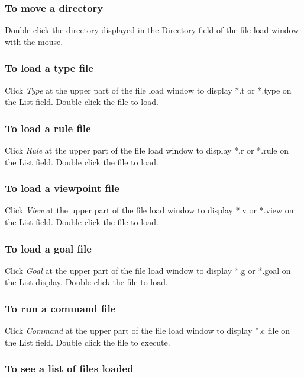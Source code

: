 \subsubsection{To move a directory}
Double click the directory displayed in the Directory field of the file load window with the mouse.

\subsubsection{To load a type file}
Click {\sl Type} at the upper part of the file load window to display *.t or *.type on the List field.
Double click the file to load. 

\subsubsection{To load a rule file}

Click {\sl Rule} at the upper part of the file load window to display *.r or *.rule on the List field.
Double click the file to load. 

\subsubsection{To load a viewpoint file}

Click {\sl View} at the upper part of the file load window to display *.v or *.view on the List field.
Double click the file to load. 

\subsubsection{To load a goal file}

Click {\sl Goal} at the upper part of the file load window to display *.g or *.goal on the List display.  
Double click the file to load.

\subsubsection{To run a command file}

Click {\sl Command} at the upper part of the file load window to display *.c file on the List field.  
Double click the file to execute.

\subsubsection{To see a list of files loaded}

